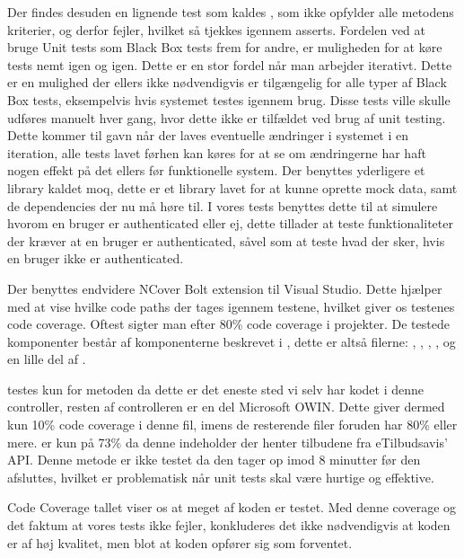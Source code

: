 Der findes desuden en lignende test som kaldes , som ikke opfylder alle metodens kriterier, og derfor fejler, hvilket så tjekkes igennem asserts.
Fordelen ved at bruge Unit tests som Black Box tests frem for andre, er muligheden for at køre tests nemt igen og igen.
Dette er en stor fordel når man arbejder iterativt.
Dette er en mulighed der ellers ikke nødvendigvis er tilgængelig for alle typer af Black Box tests, eksempelvis hvis systemet testes igennem brug.
Disse tests ville skulle udføres manuelt hver gang, hvor dette ikke er tilfældet ved brug af unit testing.
Dette kommer til gavn når der laves eventuelle ændringer i systemet i en iteration, alle tests lavet førhen kan køres for at se om ændringerne har haft nogen effekt på det ellers før funktionelle system. 
Der benyttes yderligere et library kaldet moq, dette er et library lavet for at kunne oprette mock data, samt de dependencies der nu må høre til.
I vores tests benyttes dette til at simulere hvorom en bruger er authenticated eller ej, dette tillader at teste funktionaliteter der kræver at en bruger er authenticated, såvel som at teste hvad der sker, hvis en bruger ikke er authenticated.

Der benyttes endvidere NCover Bolt extension til Visual Studio. 
Dette hjælper med at vise hvilke code paths der tages igennem testene, hvilket giver os testenes code coverage.
Oftest sigter man efter 80\% code coverage i projekter. \citep{Code_Coverage}
De testede komponenter består af komponenterne beskrevet i , dette er altså filerne: , , , ,  og en lille del af .

 testes kun for metoden  da dette er det eneste sted vi selv har kodet i denne controller, resten af controlleren er en del Microsoft OWIN.
Dette giver dermed kun 10\% code coverage i denne fil, imens de resterende filer foruden   har 80\% eller mere.
 er kun på 73\% da denne indeholder  der henter tilbudene fra eTilbudsavis' API. 
Denne metode er ikke testet da den tager op imod 8 minutter før den afsluttes, hvilket er problematisk når unit tests skal være hurtige og effektive.

Code Coverage tallet viser os at meget af koden er testet.
Med denne coverage og det faktum at vores tests ikke fejler, konkluderes det ikke nødvendigvis at koden er af høj kvalitet, men blot at koden opfører sig som forventet.
